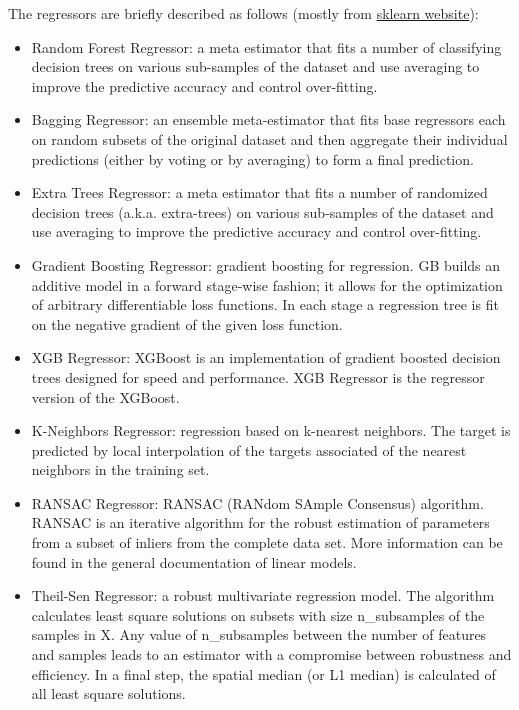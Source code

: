 \documentclass[a4paper]{article}
\begin{document}
				The regressors are briefly described as follows (mostly from \href{http://scikit-learn.org/stable/supervised_learning.html#supervised-learning}{sklearn website}):
				\begin{itemize}
					\item Random Forest Regressor: a meta estimator that fits a number of classifying decision trees on various sub-samples of the dataset and use averaging to improve the predictive accuracy and control over-fitting.
					
					\item Bagging Regressor: an ensemble meta-estimator that fits base regressors each on random subsets of the original dataset and then aggregate their individual predictions (either by voting or by averaging) to form a final prediction.
					
					\item Extra Trees Regressor: a meta estimator that fits a number of randomized decision trees (a.k.a. extra-trees) on various sub-samples of the dataset and use averaging to improve the predictive accuracy and control over-fitting.
					
					\item Gradient Boosting Regressor: gradient boosting for regression. GB builds an additive model in a forward stage-wise fashion; it allows for the optimization of arbitrary differentiable loss functions. In each stage a regression tree is fit on the negative gradient of the given loss function.
					
					\item XGB Regressor: XGBoost is an implementation of gradient boosted decision trees designed for speed and performance. XGB Regressor is the regressor version of the XGBoost.					
					
					\item K-Neighbors Regressor: regression based on k-nearest neighbors. The target is predicted by local interpolation of the targets associated of the nearest neighbors in the training set.
					
					\item RANSAC Regressor: RANSAC (RANdom SAmple Consensus) algorithm. RANSAC is an iterative algorithm for the robust estimation of parameters from a subset of inliers from the complete data set. More information can be found in the general documentation of linear models.
					
					\item Theil-Sen Regressor: a robust multivariate regression model. The algorithm calculates least square solutions on subsets with size n\_subsamples of the samples in X. Any value of n\_subsamples between the number of features and samples leads to an estimator with a compromise between robustness and efficiency. In a final step, the spatial median (or L1 median) is calculated of all least square solutions.
					

\end{itemize}
\end{document}
